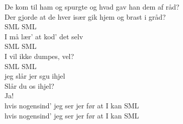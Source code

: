 De kom til ham og spurgte og hvad gav han dem af råd?\\
Der gjorde at de hver især gik hjem og brast i gråd?\\


SML SML\\
I må lær' at kod' det selv\\
SML SML\\
I vil ikke dumpes, vel?\\
SML SML\\
jeg slår jer sgu ihjel\\
Slår du os ihjel?\\
Ja!\\
hvis nogensind' jeg ser jer før at I kan SML\\
hvis nogensind' jeg ser jer før at I kan SML\\
